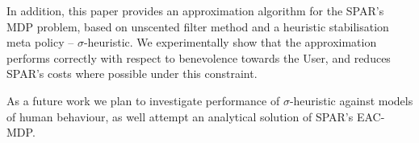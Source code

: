 \documentclass{msdm2012}
\begin{document}
In addition, this paper provides an approximation algorithm for the
SPAR's MDP problem, based on unscented filter method and a heuristic
stabilisation meta policy -- $\sigma$-heuristic. We experimentally
show that the approximation performs correctly with respect to 
benevolence towards the User, and reduces SPAR's costs where possible under
this constraint.

As a future work we plan to investigate performance of
$\sigma$-heuristic against models of human behaviour, as well attempt
an analytical solution of SPAR's EAC-MDP.


\end{document}

